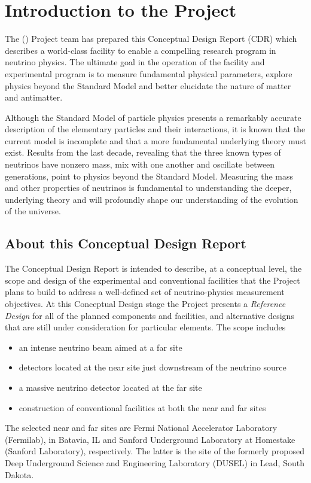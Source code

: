 

\section{Introduction to the \expshort Project}
\label{sec:intro-lbne-each-vol}

The \explong (\expshort) Project team has prepared this Conceptual
Design Report (CDR) which describes a world-class facility to enable a compelling research program in 
neutrino physics. The ultimate goal in
the operation of the facility and experimental program is to measure fundamental physical
parameters, explore physics beyond the Standard Model and better elucidate the nature of matter
and antimatter. 

Although the Standard Model of particle physics presents a remarkably accurate
description of the elementary particles and their interactions, it is known that the current
model is incomplete and that a more fundamental underlying theory must exist. Results from the
last decade, revealing that the three known types of neutrinos have nonzero mass, mix with one
another and oscillate between generations, point to physics beyond the Standard Model.
Measuring the mass and other properties of neutrinos is fundamental to understanding the deeper,
underlying theory and will profoundly shape our understanding of the evolution of the universe.


\subsection{About this Conceptual Design Report}
The \expshort Conceptual Design Report is intended to describe, at a conceptual level, the scope and 
design of the experimental and conventional facilities that the \expshort Project plans to build to address 
a well-defined set of neutrino-physics measurement objectives.  At this Conceptual Design stage the 
\expshort Project presents a {\em Reference Design} for all of the planned components and facilities, and 
alternative designs that are still under consideration for particular elements. 
The scope includes 
\begin{itemize}
\item an intense neutrino beam aimed at a far site
\item detectors located at the near site just downstream of the neutrino source
\item a massive neutrino detector located at the far site
\item construction of conventional facilities at both the near and far sites
\end{itemize}
The selected near and far sites are Fermi National Accelerator Laboratory (Fermilab), in Batavia, IL and  
Sanford Underground Laboratory at Homestake (Sanford Laboratory), respectively. The latter is the site of 
the formerly proposed Deep Underground Science and Engineering
Laboratory (DUSEL) in Lead, South Dakota.


